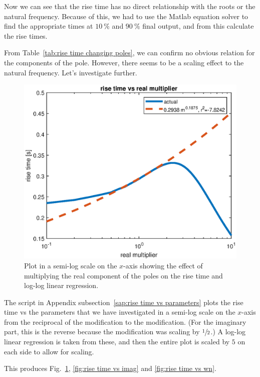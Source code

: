 \documentclass[12pt]{article}
\begin{document}
Now we can see that the rise time has no direct relationship with the roots or the natural frequency.
Because of this, we had to use the Matlab equation solver to find the appropriate times at $\SI{10}\percent$ and $\SI{90}\percent$ final output,
and from this calculate the rise times.

From Table~\ref{tab:rise time changing poles}, we can confirm no obvious relation for the components of the pole. However, there seems to be a scaling effect to the natural frequency. Let's investigate further.

\begin{figure}
    \centering
    \includegraphics[width=\linewidth]{img/part01_rise_time_vs_real.eps}
    \caption{Plot in a semi-log scale on the $x$-axis
    showing the effect of multiplying the real component of the poles on the rise time and log-log linear regression.}
    \label{fig:rise time vs real}
\end{figure}

The script in Appendix subsection~\ref{sap:rise time vs parameters}
plots the rise time vs the parameters that we have investigated
in a semi-log scale on the $x$-axis
from the reciprocal of the modification to the modification.
(For the imaginary part, this is the reverse because the modification was scaling by $\sfrac12$.)
A log-log linear regression is taken from these, and then the entire plot is scaled by $5$ on each side
to allow for scaling.

This produces Fig.~\ref{fig:rise time vs real}, \ref{fig:rise time vs imag} and \ref{fig:rise time vs wn}.
\end{document}
